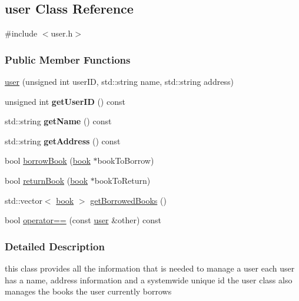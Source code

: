 \hypertarget{classuser}{}\subsection{user Class Reference}
\label{classuser}


{\ttfamily \#include $<$user.\+h$>$}

\subsubsection*{Public Member Functions}
\begin{DoxyCompactItemize}
\item 
\hyperlink{classuser_aeaedee1afa1e244cd27028ee2e37ab4d}{user} (unsigned int user\+ID, std\+::string name, std\+::string address)
\item 
\mbox{\label{classuser_adfd56d243ee0705b60b498d45111da7d}} 
unsigned int {\bfseries get\+User\+ID} () const
\item 
\mbox{\label{classuser_a65ac3c6b086539a0033e62ae2180cc08}} 
std\+::string {\bfseries get\+Name} () const
\item 
\mbox{\label{classuser_ad78f65094cebd64788b47b734bc35d1b}} 
std\+::string {\bfseries get\+Address} () const
\item 
bool \hyperlink{classuser_ad62b7343f368a96742b9e48332ef91af}{borrow\+Book} (\hyperlink{classbook}{book} $\ast$book\+To\+Borrow)
\item 
bool \hyperlink{classuser_adb88e0898e2024231a9f2852893469ac}{return\+Book} (\hyperlink{classbook}{book} $\ast$book\+To\+Return)
\item 
std\+::vector$<$ \hyperlink{classbook}{book} $>$ \hyperlink{classuser_a9e436323a3549a846d342ba313b6bf0e}{get\+Borrowed\+Books} ()
\item 
bool \hyperlink{classuser_aa683f6e1dbaaa382dc62eae8f33e9b08}{operator==} (const \hyperlink{classuser}{user} \&other) const
\end{DoxyCompactItemize}


\subsubsection{Detailed Description}
this class provides all the information that is needed to manage a user each user has a name, address information and a systemwide unique id the user class also manages the books the user currently borrows 

